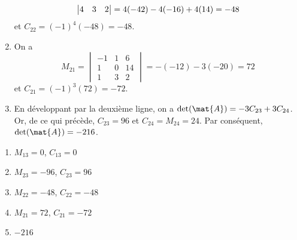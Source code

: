 \begin{exercice}
\begin{sol}
\begin{enumerate}
\begin{displaymath}
\begin{vmatrix}
          4 &  3 &  2
        \end{vmatrix}
        = 4(-42) - 4(-16) + 4(14) \\
        = -48
      \end{displaymath}
      et $C_{22} = (-1)^4 (-48) = -48$.
    \item On a
      \begin{displaymath}
        M_{21}
        =
        \begin{vmatrix}
          -1 &  1 &  6 \\
           1 &  0 & 14 \\
           1 &  3 &  2
        \end{vmatrix}
        = -(-12 ) - 3(-20)
        = 72
      \end{displaymath}
      et $C_{21} = (-1)^3 (72) = -72$.
    \item En développant par la deuxième ligne, on a $\det(\mat{A}) =
      -3 C_{23} + 3 C_{24}$. Or, de ce qui précède, $C_{23} = 96$ et
      $C_{24} = M_{24} = 24$. Par conséquent, $\det(\mat{A}) = -216$.
    \end{enumerate}
  \end{sol}
  \begin{rep}
    \begin{enumerate}
    \item $M_{13} =   0$, $C_{13} =   0$
    \item $M_{23} = -96$, $C_{23} =  96$
    \item $M_{22} = -48$, $C_{22} = -48$
    \item $M_{21} =  72$, $C_{21} = -72$
    \item $-216$
    \end{enumerate}
  \end{rep}
\end{exercice}






